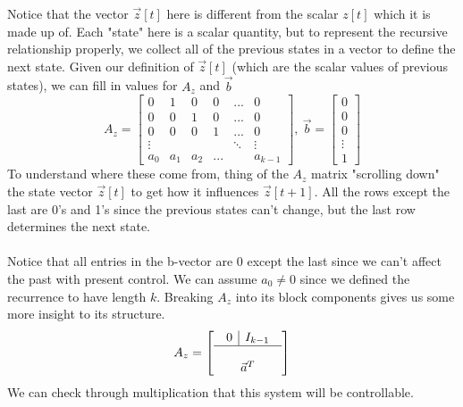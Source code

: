 \documentclass{article}
\begin{document}
Notice that the vector $\vec{z}[t]$ here is different from the scalar $z[t]$ which it is made up of. Each "state" here is a scalar quantity, but to represent the recursive relationship properly, we collect all of the previous states in a vector to define the next state.
\break\break
Given our definition of $\vec{z}[t]$ (which are the scalar values of previous states), we can fill in values for $A_z$ and $\vec{b}$
\[
    A_z = \left[
        \begin{array}{cccccc}
            0 & 1 & 0 & 0 & ... & 0\\
            0 & 0 & 1 & 0 & ... & 0\\
            0 & 0 & 0 & 1 & ... & 0\\
            \vdots & & & & \ddots & \vdots\\
            a_0 & a_1 & a_2 & ... & & a_{k-1}
        \end{array}
    \right],\>
    \vec{b} = \left[
        \begin{array}{c}
            0\\
            0\\
            0\\
            \vdots\\
            1
        \end{array}
    \right]
\]
To understand where these come from, thing of the $A_z$ matrix "scrolling down" the state vector $\vec{z}[t]$ to get how it influences $\vec{z}[t+1]$.
All the rows except the last are 0's and 1's since the previous states can't change, but the last row determines the next state.
\\\\Notice that all entries in the b-vector are 0 except the last since we can't affect the past with present control.
We can assume $a_0\ne 0$ since we defined the recurrence to have length $k$. Breaking $A_z$ into its block components gives us some more insight to its structure.
\[
    A_z = \left[
        \begin{array}{c}
            \begin{array}{c|c}
                0 & I_{k-1}\\
            \end{array} \\
            \hline \\
            \vec{a}^T
        \end{array}
    \right]
\]
We can check through multiplication that this system will be controllable.
\end{document}
